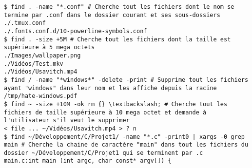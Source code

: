 \begin{lstlisting}
$ find . -name "*.conf" # Cherche tout les fichiers dont le nom se termine par .conf dans le dossier courant et ses sous-dossiers
./.tmux.conf
./.fonts.conf.d/10-powerline-symbols.conf
$ find . -size +5M # Cherche tout les fichiers dont la taille est supérieure à 5 mega octets
./Images/wallpaper.png
./Vidéos/Test.mkv
./Vidéos/Usavitch.mp4
$ find / -name "*windows*" -delete -print # Supprime tout les fichiers ayant "windows" dans leur nom et les affiche depuis la racine
/tmp/hate-windows.pdf
$ find ~ -size +10M -ok rm {} \textbackslash; # Cherche tout les fichiers de taille supérieure à 10 mega octet et demande à l'utilisateur s'il veut le supprimer
< file ... ~/Vidéos/Usavitch.mp4 > ? n
$ find ~/Développement/C/Projet1/ -name "*.c" -print0 | xargs -0 grep main # Cherche la chaine de caractère "main" dans tout les fichiers du dossier ~/Développement/C/Projet1 qui se terminent par .c
main.c:int main (int argc, char const* argv[]) {
\end{lstlisting}
